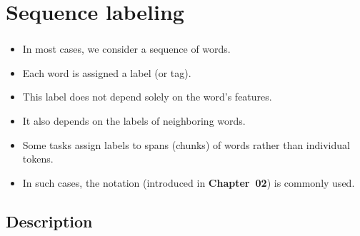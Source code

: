 \documentclass[xcolor=table]{beamer}
\begin{document}
\section{Sequence labeling}

\begin{frame}
	\frametitle{\insertshortsubtitle}
	\framesubtitle{\insertsection}
	
	\begin{itemize}
		\item In most cases, we consider a sequence of words.
		\item Each word is assigned a label (or tag).
		\item This label does not depend solely on the word's features.
		\item It also depends on the labels of neighboring words.
		\item Some tasks assign labels to spans (chunks) of words rather than individual tokens.
		\item In such cases, the  notation (introduced in \textbf{Chapter~02}) is commonly used.
	\end{itemize}
	
\end{frame}

\subsection{Description}
\end{document}
